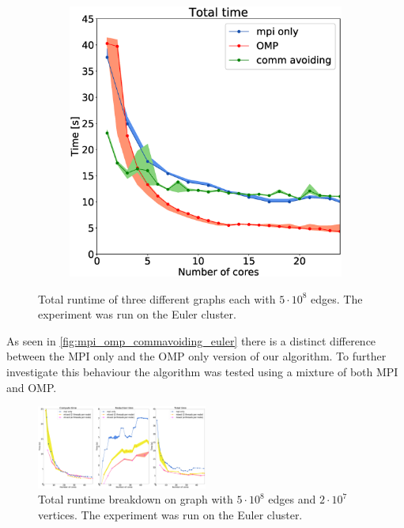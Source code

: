 \begin{figure}
\begin{subfigure}[c]{0.15\textwidth}
\label{fig:mpi_omp_commavoiding_euler_2}
\end{subfigure}
\begin{subfigure}[c]{0.15\textwidth}
\includegraphics[width=\textwidth]{plots/20000our_impl}
\label{fig:mpi_omp_commavoiding_euler_3}
\end{subfigure}
\caption{Total runtime of three different graphs each with $5\cdot10^{8}$ edges. The experiment was run on the Euler cluster.}
\label{fig:mpi_omp_commavoiding_euler}
\end{figure}

As seen in \autoref{fig:mpi_omp_commavoiding_euler} there is a distinct difference between the MPI only and the OMP only version of our algorithm. To further investigate this behaviour the algorithm was tested using a mixture of both MPI and OMP.

\begin{figure}
\includegraphics[width=0.5\textwidth]{plots/20000mpi_mixtures_with_everything}
\caption{Total runtime breakdown on graph with $5\cdot10^{8}$ edges and $2\cdot10^{7}$ vertices. The experiment was run on the Euler cluster.}
\label{fig:mixed_euler}
\end{figure}

